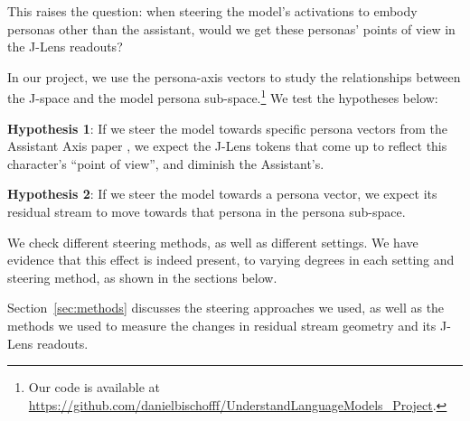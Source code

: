 This raises the question: when steering the model's activations to
embody personas other than the assistant, would we get these personas' points of view in the J-Lens readouts?

In our project, we use the persona-axis vectors to study the relationships between the J-space and the model persona sub-space.\footnote{Our code is available at \url{https://github.com/danielbischofff/UnderstandLanguageModels_Project}.}
We test the hypotheses below:

\textbf{Hypothesis 1}: If we steer the model towards specific persona vectors from the Assistant Axis paper \citep{lu2026assistant}, we expect the J-Lens tokens that come up to reflect this character's ``point of view'', and diminish the Assistant's.

\textbf{Hypothesis 2}: If we steer the model towards a persona vector, we expect its residual stream to move towards that persona in the persona sub-space.

We check different steering methods, as well as different settings. We have evidence that this effect is indeed present, to varying degrees in each setting and steering method, as shown in the sections below.

Section~\ref{sec:methods} discusses the steering approaches we used, as well as the methods we used to measure the changes in residual stream geometry and its J-Lens readouts.